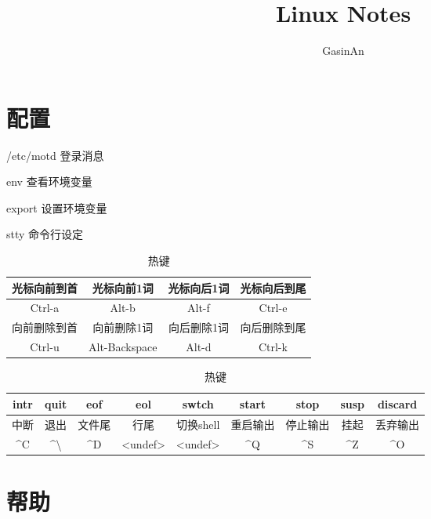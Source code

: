 \documentclass[12pt]{ctexart}
\title{Linux Notes}
\author{GasinAn}
\theoremstyle{definition}
\begin{document}
    \maketitle

    \tableofcontents

    \section{配置}

    /etc/motd 登录消息

    env 查看环境变量

    export 设置环境变量

    stty 命令行设定

    \begin{table}[htbp]
        \centering
        \begin{tabular}{|c|c|c|c|}
            \hline
            光标向前到首 & 光标向前1词 & 光标向后1词 & 光标向后到尾 \\
            \hline
            Ctrl-a & Alt-b & Alt-f & Ctrl-e\\
            \hline
            向前删除到首 & 向前删除1词 & 向后删除1词 & 向后删除到尾 \\
            \hline
            Ctrl-u & Alt-Backspace & Alt-d & Ctrl-k\\
            \hline
        \end{tabular}
        \caption{热键}
    \end{table}

    \begin{table}[htbp]
        \centering
        \begin{tabular}{|c|c|c|c|c|c|c|c|c|}
            \hline
            intr & quit & eof & eol & swtch & start & stop & susp & discard \\
            \hline
            中断 & 退出 & 文件尾 & 行尾 & 切换shell & 重启输出 & 停止输出 & 挂起 & 丢弃输出 \\
            \hline
            \^{}C & \^{}\textbackslash & \^{}D & <undef> & <undef> & \^{}Q & \^{}S & \^{}Z & \^{}O \\
            \hline
        \end{tabular}
        \caption{热键}
    \end{table}

    \section{帮助}
\end{document}
